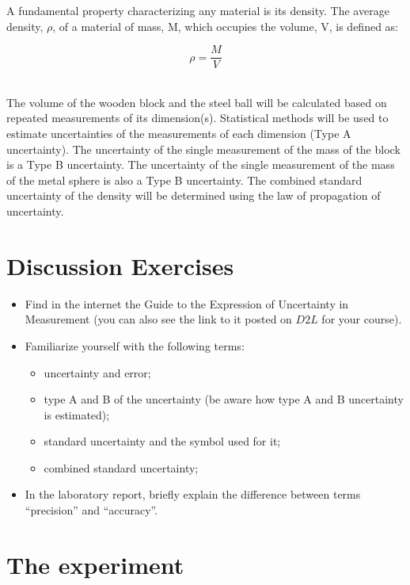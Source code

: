 A fundamental property characterizing any material is its density. The average density, $\rho$, of a material of mass, M, which occupies the volume, V, is defined as:

\begin{equation}\label{eq:densityqn}
{\rho}=\frac{M}{V}
\end{equation} 
\

The volume of the wooden block and the steel ball will be calculated based on repeated measurements of its dimension(s). Statistical methods will be used to estimate uncertainties of the measurements of each dimension (Type A uncertainty). The uncertainty of the single measurement of the mass of the block is a Type B uncertainty. The uncertainty of the single measurement of the mass of the metal sphere is also a Type B uncertainty. The combined standard uncertainty of the density will be determined using the law of propagation of uncertainty.



\section{Discussion Exercises}
\begin{itemize}
\item
Find in the internet the Guide to the Expression of Uncertainty in Measurement (you can also see the link to it posted on $D2L$ for your course).
\item
Familiarize yourself with the following terms: 
\begin{itemize}
\item uncertainty and error;
\item type A and B of the uncertainty (be aware how type A and B uncertainty is estimated);
\item standard uncertainty and the symbol used for it;
\item combined standard uncertainty;
\end{itemize}
\item In the laboratory report, briefly explain the difference between terms ``precision'' and ``accuracy''.
\end{itemize}


\section{The experiment}

